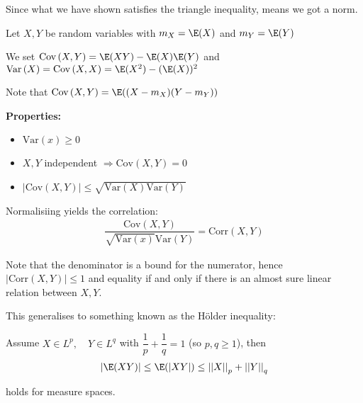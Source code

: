 \par\bigskip
\noindent Since what we have shown satisfies the triangle inequality, means we got a norm.
\par\bigskip
\begin{defo}{}
  Let $X,Y$ be random variables with $m_X=\E(X)$ and $m_Y=\E(Y)$\par
  \noindent We set $\text{Cov}\left(X,Y\right) = \E(XY)-\E(X)\E(Y)$ and $\text{Var}\left(X\right) = \text{Cov}\left(X,X\right) = \E(X^2)-(\E(X))^2$
  \par\bigskip
  \noindent Note that $\text{Cov}\left(X,Y\right) = \E((X-m_X)(Y-m_Y))$
\end{defo}
\par\bigskip
\noindent\textbf{Properties:}
\begin{itemize}
  \item $\text{Var}\left(x\right)\geq0$
  \item $X,Y$ independent $\Rightarrow \text{Cov}\left(X,Y\right) = 0$
  \item $\left|\text{Cov}\left(X,Y\right)\right|\leq \sqrt{\text{Var}\left(X\right)\text{Var}\left(Y\right)}$
\end{itemize}\par
\noindent Normalisiing yields the correlation:
\begin{equation*}
  \begin{gathered}
    \dfrac{\text{Cov}\left(X,Y\right)}{\sqrt{\text{Var}\left(x\right)}\text{Var}\left(Y\right)} = \text{Corr}\left(X,Y\right)
  \end{gathered}
\end{equation*}\par
\noindent Note that the denominator is a bound for the numerator, hence $\left|\text{Corr}\left(X,Y\right)\right|\leq1$ and equality if and only if there is an almost sure linear relation between $X,Y$.
\par\bigskip
\noindent This generalises to something known as the Hölder inequality:\par
Assume $X\in L^p,\quad Y\in L^q$ with $\dfrac{1}{p}+\dfrac{1}{q}=1$ (so $p,q\geq1$), then
\begin{equation*}
  \begin{gathered}
    \left|\E(XY)\right|\leq \E(\left|XY\right|)\leq \left|\left|X\right|\right|_p+\left|\left|Y\right|\right|_q
  \end{gathered}
\end{equation*}\par
\noindent holds for measure spaces.
